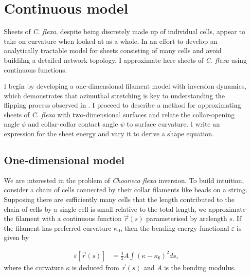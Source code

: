 
\chapter{Continuous model} \label{ch:2}

\ifpdf
    \graphicspath{{Chapter2/Figs/Raster/}{Chapter2/Figs/PDF/}{Chapter2/Figs/}}
\else
    \graphicspath{{Chapter2/Figs/Vector/}{Chapter2/Figs/}}
\fi

Sheets of \textit{C. flexa}, despite being discretely made up of individual cells, appear to take on curvature when looked at as a whole. 
In an effort to develop an analytically tractable model for sheets consisting of many cells and avoid buildilng a detailed network topology, I approximate here sheets of \textit{C. flexa} using continuous functions.

I begin by developing a one-dimensional filament model with inversion dynamics, which demonstrates that azimuthal stretching is key to understanding the flipping process observed in \citet{brunet2019}. 
I proceed to describe a method for approximating sheets of \textit{C. flexa} with two-dimensional surfaces and relate the collar-opening angle $\phi$ and collar-collar contact angle $\psi$ to surface curvature. 
I write an expression for the sheet energy and vary it to derive a shape equation.

\section{One-dimensional model} \label{sec:c_1d}

We are interested in the problem of \textit{Choaneca flexa} inversion. 
To build intuition, consider a chain of cells connected by their collar filaments like beads on a string. 
Supposing there are sufficiently many cells that the length contributed to the chain of cells by a single cell is small relative to the total length, we approximate the filament with a continuous function $\vec{r}(s)$ parameterised by arclength $s$.
If the filament has preferred curvature $\kappa_0$, then the bending energy functional $\varepsilon$ is given by 

\begin{align*}
    \varepsilon[\vec{r}(s)] &= \frac{1}{2} A \int (\kappa - \kappa_0)^2 ds, 
\end{align*}
\noindent where the curvature $\kappa$ is deduced from $\vec{r}(s)$ and $A$ is the bending modulus. 

